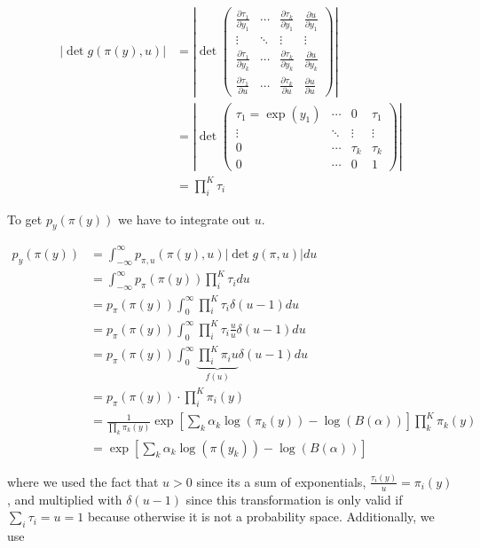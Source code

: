 \begin{align}
	|\det g(\pi(y), u)| &= \left|\det\begin{pmatrix}
		\frac{\partial \tau_1}{\partial y_1} & \cdots & \frac{\partial \tau_k}{\partial y_1} & \frac{\partial u}{\partial y_1} \\
		\vdots & \ddots & \vdots & \vdots \\
		\frac{\partial \tau_1}{\partial y_k} & \cdots & \frac{\partial \tau_k}{\partial y_k} & \frac{\partial u}{\partial y_k} \\
		\frac{\partial \tau_1}{\partial u} & \cdots & \frac{\partial \tau_k}{\partial u} & \frac{\partial u}{\partial u}
	\end{pmatrix} \right| \\
	&= \left|\det\begin{pmatrix}
	\tau_1 = \exp(y_1) & \cdots & 0 & \tau_1 \\
	\vdots & \ddots & \vdots & \vdots \\
	0 & \cdots & \tau_k & \tau_k \\
	0 & \cdots & 0 & 1
	\end{pmatrix} \right| \\
	&= \prod_i^{K} \tau_i 
\end{align}

To get $p_y(\pi(y))$ we have to integrate out $u$. 

\begin{align}
	p_y(\pi(y)) &=\int_{-\infty}^{\infty} p_{\pi, u}(\pi(y), u) |\det g(\pi, u)| du \\
	&= \int_{-\infty}^{\infty} p_{\pi}(\pi(y))  \prod_i^{K} \tau_i  du \\
	&= p_{\pi}(\pi(y)) \int_{0}^{\infty}  \prod_i^{K} \tau_i \delta(u-1) du \\
	&= p_{\pi}(\pi(y)) \int_{0}^{\infty}  \prod_i^{K} \tau_i \frac{u}{u} \delta(u-1) du \\
	&= p_{\pi}(\pi(y)) \int_{0}^{\infty}  \underbrace{\prod_i^{K} \pi_i u}_{f(u)} \delta(u-1) du \\
	&= p_{\pi}(\pi(y)) \cdot \prod_i^{K} \pi_i(y) \\
	&= \frac{1}{\prod_k \pi_k(y)} \exp\left[\sum_k\alpha_k\log(\pi_k(y)) - \log(B(\alpha))\right] \prod_k^{K} \pi_k(y) \\
	&= \exp\left[\sum_k\alpha_k\log(\pi(y_k)) - \log(B(\alpha))\right]
\end{align}

where we used the fact that $u > 0$ since its a sum of exponentials, $\frac{\tau_i(y)}{u} = \pi_i(y)$, and multiplied with $\delta(u-1)$ since this transformation is only valid if $\sum_i \tau_i = u = 1$ because otherwise it is not a probability space. Additionally, we use

